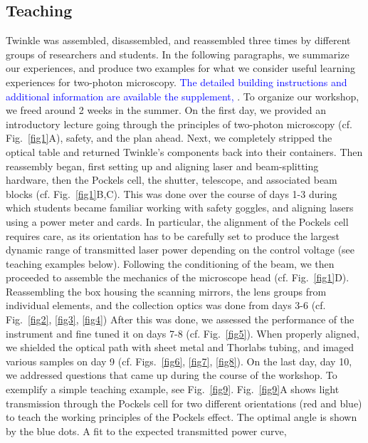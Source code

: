 \documentclass[10pt,letterpaper]{article}
\begin{document}
\subsection*{Teaching}
Twinkle was assembled, disassembled, and reassembled three times by different groups of researchers and students. In the following paragraphs, we summarize our experiences, and produce two examples for what we consider useful learning experiences for two-photon microscopy. \textcolor{blue}{The detailed building instructions and additional information are available the supplement, }.\newline
To organize our workshop, we freed around 2 weeks in the summer. On the first day, we provided an introductory lecture going through the principles of two-photon microscopy (cf. Fig.~\ref{fig1}A), safety, and the plan ahead. Next, we completely stripped the optical table and returned Twinkle's components back into their containers. Then reassembly began, first setting up and aligning laser and beam-splitting hardware, then the Pockels cell, the shutter, telescope, and associated beam blocks (cf. Fig.~\ref{fig1}B,C). This was done over the course of days 1-3 during which students became familiar working with safety goggles, and aligning lasers using a power meter and cards. In particular, the alignment of the Pockels cell requires care, as its orientation has to be carefully set to produce the largest dynamic range of transmitted laser power depending on the control voltage (see teaching examples below). Following the conditioning of the beam, we then proceeded to assemble the mechanics of the microscope head (cf. Fig.~\ref{fig1}D). Reassembling the box housing the scanning mirrors, the lens groups from individual elements, and the collection optics was done from days 3-6 (cf. Fig.~\ref{fig2}, \ref{fig3}, \ref{fig4}) After this was done, we assessed the performance of the instrument and fine tuned it on days 7-8 (cf. Fig.~\ref{fig5}). When properly aligned, we shielded the optical path with sheet metal and Thorlabs tubing, and imaged various samples on day 9 (cf. Figs.~\ref{fig6}, \ref{fig7}, \ref{fig8}). On the last day, day 10, we addressed questions that came up during the course of the workshop.\newline
To exemplify a simple teaching example, see Fig.~\ref{fig9}. Fig.~\ref{fig9}A shows light transmission through the Pockels cell for two different orientations (red and blue) to teach the working principles of the Pockels effect. The optimal angle is shown by the blue dots. A fit to the expected transmitted power curve, 
\end{document}
